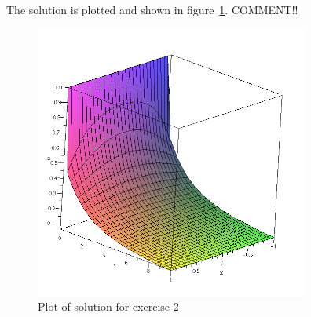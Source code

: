     The solution is plotted and shown in figure~\ref{fig:q2-plot}. COMMENT!!
    \begin{figure}
        \centering
        \includegraphics[width=90mm]{q2-plot.png}
        \caption{Plot of solution for exercise 2}
        \label{fig:q2-plot}
    \end{figure}

